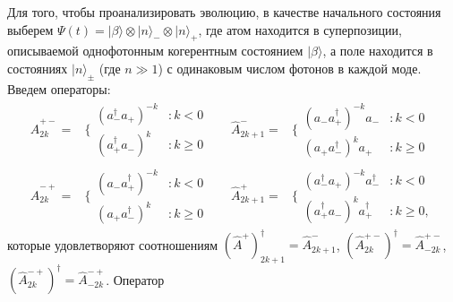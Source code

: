 Для того, чтобы проанализировать эволюцию, в качестве начального состояния выберем $\Psi(t) = |\beta\rangle\otimes | n\rangle_-\otimes |n\rangle_+$, где атом находится в суперпозиции, описываемой однофотонным когерентным состоянием  $|\beta\rangle$, а поле находится в состояниях $|n\rangle_\pm$ (где $n \gg 1$) с одинаковым числом фотонов в каждой моде.
Введем операторы:  
\begin{subequations}
	\begin{alignat}{2}
		\hat{A}_{2k}^{+-} = &\Bigg\{
		\begin{array}{lr}
			(a^\dag_- a_+)^{-k} & : k < 0\\
			(a^\dag_+ a_-)^k & : k \ge 0
		\end{array}
		&\quad
		\hat{A}_{2k+1}^- = &\Bigg\{
		\begin{array}{lr}
			(a_- a^\dag_+)^{-k} a_- & : k < 0\\
			(a_+ a^\dag_-)^k a_+ & : k \ge 0
		\end{array}
		\\
		\hat{A}_{2k}^{-+} = &\Bigg\{
		\begin{array}{lr}
			(a_- a^\dag_+)^{-k} & : k < 0\\
			(a_+ a^\dag_-)^k & : k \ge 0
		\end{array}
		&\quad
		\hat{A}_{2k+1}^+ = &\Bigg\{
		\begin{array}{lr}
			(a^\dag_- a_+)^{-k} a^\dag_- & : k < 0\\
			(a^\dag_+ a_-)^k a^\dag_+ & : k \ge 0 ,
		\end{array}
	\end{alignat}
\end{subequations}
которые удовлетворяют соотношениям $(\hat{A}^{+})_{2k+1}^\dag = \hat{A}^-_{2k+1}$, $(\hat{A}^{+-}_{2k})^\dag = \hat{A}^{+-}_{-2k}$, $(\hat{A}^{-+}_{2k})^\dag = \hat{A}^{-+}_{-2k}$. 
Оператор
